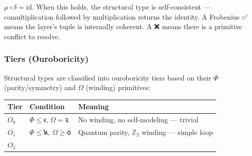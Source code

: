 \documentclass[12pt,a4paper]{article}
\begin{document}
\(\mu\circ\delta=\text{id}\). When this holds, the structural type is
self-consistent --- comultiplication followed by multiplication returns
the identity. A Frobenius ✅ means the layer's tuple is internally
coherent. A ❌ means there is a primitive conflict to resolve.

\hypertarget{tiers-ouroboricity}{%
\subsubsection{Tiers (Ouroboricity)}\label{tiers-ouroboricity}}

Structural types are classified into ouroboricity tiers based on their
\(\Phi\) (parity/symmetry) and \(\Omega\) (winding) primitives:

\begin{longtable}[]{@{}lll@{}}
\toprule
\begin{minipage}[b]{0.21\columnwidth}\raggedright
Tier\strut
\end{minipage} & \begin{minipage}[b]{0.39\columnwidth}\raggedright
Condition\strut
\end{minipage} & \begin{minipage}[b]{0.32\columnwidth}\raggedright
Meaning\strut
\end{minipage}\tabularnewline
\midrule
\endhead
\begin{minipage}[t]{0.21\columnwidth}\raggedright
\(O₀\)\strut
\end{minipage} & \begin{minipage}[t]{0.39\columnwidth}\raggedright
\(\Phi \leq 𐑬\), \(\Omega = 𐑷\)\strut
\end{minipage} & \begin{minipage}[t]{0.32\columnwidth}\raggedright
No winding, no self-modeling --- trivial\strut
\end{minipage}\tabularnewline
\begin{minipage}[t]{0.21\columnwidth}\raggedright
\(O₁\)\strut
\end{minipage} & \begin{minipage}[t]{0.39\columnwidth}\raggedright
\(\Phi \leq 𐑿\), \(\Omega \geq 𐑴\)\strut
\end{minipage} & \begin{minipage}[t]{0.32\columnwidth}\raggedright
Quantum parity, \(\mathbb{Z}_2\) winding --- simple loop\strut
\end{minipage}\tabularnewline
\begin{minipage}[t]{0.21\columnwidth}\raggedright
\(O₂\)\strut

\end{minipage}
\end{longtable}
\end{document}
